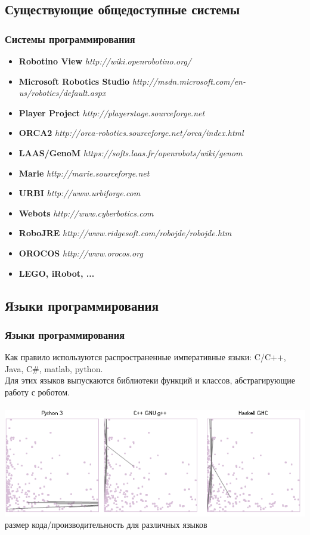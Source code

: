 \documentclass{beamer}
\begin{document}
\subsection{Существующие общедоступные системы}
\begin{frame}
\frametitle{Системы программирования}
\begin{itemize}
\item<1> \textbf{Robotino View} \textit{http://wiki.openrobotino.org/}
\item<1> \textbf{Microsoft Robotics Studio}
\textit{http://msdn.microsoft.com/en-us/robotics/default.aspx}
\item<1> \textbf{Player Project} \textit{http://playerstage.sourceforge.net}
\item<1> \textbf{ORCA2} \textit{http://orca-robotics.sourceforge.net/orca/index.html}
\item<1> \textbf{LAAS/GenoM} \textit{https://softs.laas.fr/openrobots/wiki/genom}
\item<1> \textbf{Marie} \textit{http://marie.sourceforge.net}
\item<1> \textbf{URBI} \textit{http://www.urbiforge.com}
\item<1> \textbf{Webots} \textit{http://www.cyberbotics.com}
\item<1> \textbf{RoboJRE} \textit{http://www.ridgesoft.com/robojde/robojde.htm}
\item<1> \textbf{OROCOS} \textit{http://www.orocos.org}
\item<1> \textbf{LEGO, iRobot, ...}
\end{itemize}
\end{frame}

\subsection{Языки программирования}
\begin{frame}
\frametitle{Языки программирования}
Как правило используются распространенные императивные языки: C/C++, Java, C#,
matlab, python.
\\
Для этих языков выпускаются библиотеки функций и классов, абстрагирующие работу
с роботом.
\\
\\
 
\includegraphics[scale=0.5]{languages.png}
\\
размер кода/производительность для различных языков

\end{frame}
\end{document}
